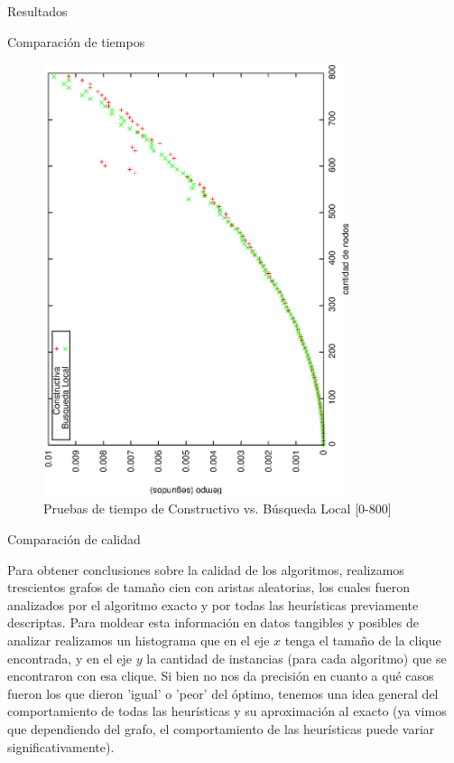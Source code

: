 \documentclass[12pt,titlepage]{article}
\begin{document}
\begin{section}{Resultados}
\begin{subsection}{Comparación de tiempos}
		\begin{figure}[H]
			\centering
					\includegraphics[width=9cm,angle=-90]{conclusiones/heuris_rapidas.eps}
			\caption{Pruebas de tiempo de Constructivo vs. Búsqueda Local [0-800]}
			\label{fig:Tiempo de const_bus_loc}
		\end{figure}

		\end{subsection}

		\begin{subsection}{Comparación de calidad}

		Para obtener conclusiones sobre la calidad de los algoritmos, realizamos trescientos grafos de tamaño cien con aristas aleatorias, los cuales fueron analizados por el algoritmo exacto y por todas las heurísticas previamente descriptas. Para moldear esta información en datos tangibles y posibles de analizar realizamos un histograma que en el eje $x$ tenga el tamaño de la clique encontrada, y en el eje $y$ la cantidad de instancias (para cada algoritmo) que se encontraron con esa clique. Si bien no nos da precisión en cuanto a qué casos fueron los que dieron 'igual' o 'peor' del óptimo, tenemos una idea general del comportamiento de todas las heurísticas y su aproximación al exacto (ya vimos que dependiendo del grafo, el comportamiento de las heurísticas puede variar significativamente).
		

\end{subsection}
\end{section}
\end{document}
